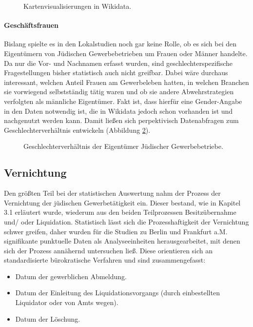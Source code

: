 \begin{figure}[h]
    \centering
    \caption{Kartenvisualisierungen in Wikidata.}
    \label{fig:wikidatamap}
\end{figure}

\paragraph{Geschäftsfrauen}
Bislang spielte es in den Lokalstudien noch gar keine Rolle, ob es sich bei den Eigentümern von Jüdischen Gewerbebetrieben um Frauen oder Männer handelte. Da nur die Vor- und Nachnamen erfasst wurden, sind geschlechterspezifische Fragestellungen bisher statistisch auch nicht greifbar. Dabei wäre durchaus interessant, welchen Anteil Frauen am Gewerbeleben hatten, in welchen Branchen sie vorwiegend selbstständig tätig waren und ob sie andere Abwehrstrategien verfolgten als männliche Eigentümer. Fakt ist, dass hierfür eine Gender-Angabe in den Daten notwendig ist, die in Wikidata jedoch schon vorhanden ist und nachgenutzt werden kann. Damit ließen sich perpektivisch Datenabfragen zum Geschlechterverhältnis entwickeln (Abbildung \ref{fig:wikidatagender}). 

\begin{figure}[h]
    \centering
    \caption{Geschlechterverhältnis der Eigentümer Jüdischer Gewerbebetriebe.}
    \label{fig:wikidatagender}
\end{figure}

\subsection{Vernichtung}

Den größten Teil bei der statistischen Auswertung nahm der Prozess der Vernichtung der jüdischen Gewerbetätigkeit ein. Dieser bestand, wie in Kapitel 3.1 erläutert wurde, wiederum aus den beiden Teilprozessen Besitzübernahme und/ oder Liquidation. Statistisch lässt sich die Prozesshaftigkeit der Vernichtung schwer greifen, daher wurden für die Studien zu Berlin und Frankfurt a.M. signifikante punktuelle Daten als Analyseeinheiten herausgearbeitet, mit denen sich der Prozess annähernd untersuchen ließ. Diese orientieren sich an standardisierte bürokratische Verfahren und sind zusammengefasst:

\begin{itemize}
    \item Datum der gewerblichen Abmeldung.
    \item Datum der Einleitung des Liquidationsvorgangs (durch einbestellten Liquidator oder von Amts wegen).
    \item Datum der Löschung.
\end{itemize}

